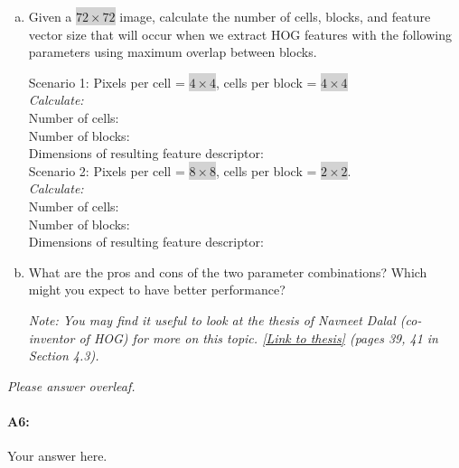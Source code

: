 \begin{enumerate}[(a)]
\item Given a \colorbox{lightgray}{$72\times72$} image, calculate the number of cells, blocks, and feature vector size that will occur when we extract HOG features with the following parameters using maximum overlap between blocks.

Scenario 1: Pixels per cell = \colorbox{lightgray}{$4\times4$}, cells per block = \colorbox{lightgray}{$4\times4$} %
\\
\emph{Calculate:}
\\ 
Number of cells: 
\\
Number of blocks: 
\\
Dimensions of resulting feature descriptor: 
\\

Scenario 2: Pixels per cell = \colorbox{lightgray}{$8\times8$}, cells per block = \colorbox{lightgray}{$2\times2$}.
\\
\emph{Calculate:}
\\ 
Number of cells:
\\
Number of blocks: 
\\
Dimensions of resulting feature descriptor: 


\item What are the pros and cons of the two parameter combinations? Which might you expect to have better performance?

\emph{Note: You may find it useful to look at the thesis of Navneet Dalal (co-inventor of HOG) for more on this topic. \href{http://lear.inrialpes.fr/people/dalal/NavneetDalalThesis.pdf}{[Link to thesis]} (pages 39, 41 in Section 4.3).}

\end{enumerate}

\emph{Please answer overleaf.}


\pagebreak
\paragraph{A6:} Your answer here.




